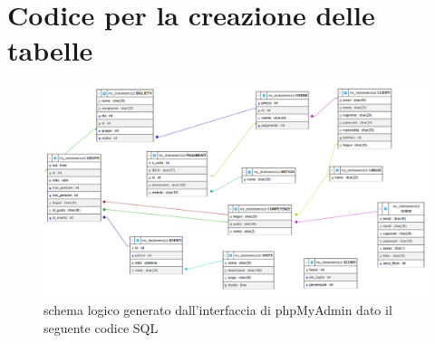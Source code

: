 \documentclass[a4paper,12pt]{report}
\begin{document}
\chapter{Codice per la creazione delle tabelle \label{A:CreateTable}}

\begin{figure}[H]
	\centering
	\includegraphics[height=0.67\textwidth,angle=90]{../resources/img/phpMyadmin.png}
	\caption{schema logico generato dall'interfaccia di phpMyAdmin dato il seguente codice SQL}
\end{figure}
\end{document}

